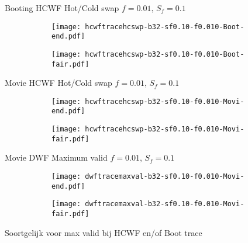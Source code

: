 \documentclass[10pt,a4paper]{beamer}
\begin{document}
\begin{frame}{Booting HCWF Hot/Cold swap $f=0.01,\, S_f=0.1$}
	\begin{figure}
		\begin{subfigure}{.48\textwidth}
			\centering
			\texttt{[image: hcwftracehcswp-b32-sf0.10-f0.010-Boot-end.pdf]}
		\end{subfigure}
		\begin{subfigure}{.48\textwidth}
			\centering
			\texttt{[image: hcwftracehcswp-b32-sf0.10-f0.010-Boot-fair.pdf]}
		\end{subfigure}
	\end{figure}
\end{frame}
\begin{frame}{Movie HCWF Hot/Cold swap $f=0.01,\, S_f=0.1$}
	\begin{figure}
		\begin{subfigure}{.48\textwidth}
			\centering
			\texttt{[image: hcwftracehcswp-b32-sf0.10-f0.010-Movi-end.pdf]}
		\end{subfigure}
		\begin{subfigure}{.48\textwidth}
			\centering
			\texttt{[image: hcwftracehcswp-b32-sf0.10-f0.010-Movi-fair.pdf]}
		\end{subfigure}
	\end{figure}
\end{frame}


\begin{frame}{Movie DWF Maximum valid $f=0.01,\, S_f=0.1$}
	\begin{figure}
		\begin{subfigure}{.48\textwidth}
			\centering
			\texttt{[image: dwftracemaxval-b32-sf0.10-f0.010-Movi-end.pdf]}
		\end{subfigure}
		\begin{subfigure}{.48\textwidth}
			\centering
			\texttt{[image: dwftracemaxval-b32-sf0.10-f0.010-Movi-fair.pdf]}
		\end{subfigure}
	\end{figure}
	Soortgelijk voor max valid bij HCWF en/of Boot trace
\end{frame}
\end{document}
